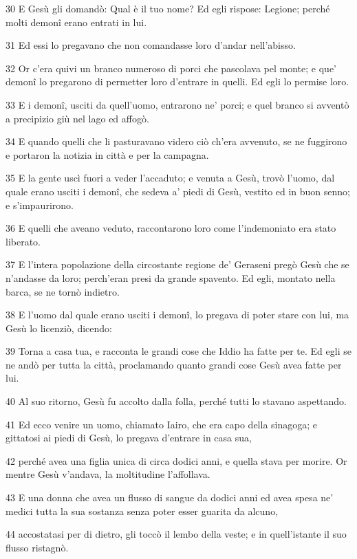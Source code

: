 \par 30 E Gesù gli domandò: Qual è il tuo nome? Ed egli rispose: Legione; perché molti demonî erano entrati in lui.
\par 31 Ed essi lo pregavano che non comandasse loro d'andar nell'abisso.
\par 32 Or c'era quivi un branco numeroso di porci che pascolava pel monte; e que' demonî lo pregarono di permetter loro d'entrare in quelli. Ed egli lo permise loro.
\par 33 E i demonî, usciti da quell'uomo, entrarono ne' porci; e quel branco si avventò a precipizio giù nel lago ed affogò.
\par 34 E quando quelli che li pasturavano videro ciò ch'era avvenuto, se ne fuggirono e portaron la notizia in città e per la campagna.
\par 35 E la gente uscì fuori a veder l'accaduto; e venuta a Gesù, trovò l'uomo, dal quale erano usciti i demonî, che sedeva a' piedi di Gesù, vestito ed in buon senno; e s'impaurirono.
\par 36 E quelli che aveano veduto, raccontarono loro come l'indemoniato era stato liberato.
\par 37 E l'intera popolazione della circostante regione de' Geraseni pregò Gesù che se n'andasse da loro; perch'eran presi da grande spavento. Ed egli, montato nella barca, se ne tornò indietro.
\par 38 E l'uomo dal quale erano usciti i demonî, lo pregava di poter stare con lui, ma Gesù lo licenziò, dicendo:
\par 39 Torna a casa tua, e racconta le grandi cose che Iddio ha fatte per te. Ed egli se ne andò per tutta la città, proclamando quanto grandi cose Gesù avea fatte per lui.
\par 40 Al suo ritorno, Gesù fu accolto dalla folla, perché tutti lo stavano aspettando.
\par 41 Ed ecco venire un uomo, chiamato Iairo, che era capo della sinagoga; e gittatosi ai piedi di Gesù, lo pregava d'entrare in casa sua,
\par 42 perché avea una figlia unica di circa dodici anni, e quella stava per morire. Or mentre Gesù v'andava, la moltitudine l'affollava.
\par 43 E una donna che avea un flusso di sangue da dodici anni ed avea spesa ne' medici tutta la sua sostanza senza poter esser guarita da alcuno,
\par 44 accostatasi per di dietro, gli toccò il lembo della veste; e in quell'istante il suo flusso ristagnò.
